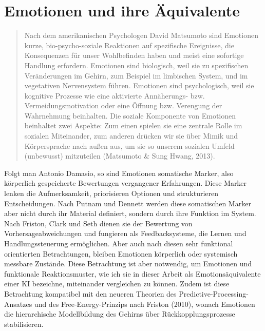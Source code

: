 \section*{Emotionen und ihre Äquivalente}
\begin{quotation}
  Nach dem amerikanischen Psychologen David Matsumoto sind Emotionen kurze, bio-psycho-soziale Reaktionen auf spezifische Ereignisse, die Konsequenzen für unser Wohlbefinden haben und meist eine sofortige Handlung erfordern. Emotionen sind biologisch, weil sie zu spezifischen Veränderungen im Gehirn, zum Beispiel im limbischen System, und im vegetativen Nervensystem führen. Emotionen sind psychologisch, weil sie kognitive Prozesse wie eine aktivierte Annäherungs- bzw. Vermeidungsmotivation oder eine Öffnung bzw. Verengung der Wahrnehmung beinhalten. Die soziale Komponente von Emotionen beinhaltet zwei Aspekte: Zum einen spielen sie eine zentrale Rolle im sozialen Miteinander, zum anderen drücken wir sie über Mimik und Körpersprache nach außen aus, um sie so unserem sozialen Umfeld (unbewusst) mitzuteilen (Matsumoto \& Sung Hwang, 2013).
\end{quotation}

Folgt man Antonio Damasio, so sind Emotionen somatische Marker, also körperlich gespeicherte Bewertungen vergangener Erfahrungen. Diese Marker lenken die Aufmerksamkeit, priorisieren Optionen und strukturieren Entscheidungen. Nach Putnam und Dennett werden diese somatischen Marker aber nicht durch ihr Material definiert, sondern durch ihre Funktion im System. Nach Friston, Clark und Seth dienen sie der Bewertung von Vorhersageabweichungen und fungieren als Feedbacksysteme, die Lernen und Handlungssteuerung ermöglichen. Aber auch nach diesen sehr funktional orientierten Betrachtungen, bleiben Emotionen körperlich oder systemisch messbare Zustände. Diese Betrachtung ist aber notwendig, um Emotionen und funktionale Reaktionsmuster, wie ich sie in dieser Arbeit als Emotionsäquivalente einer KI bezeichne, miteinander vergleichen zu können. Zudem ist diese Betrachtung kompatibel mit den neueren Theorien des Predictive-Processing-Ansatzes und des Free-Energy-Prinzips nach Friston (2010), wonach Emotionen die hierarchische Modellbildung des Gehirns über Rückkopplungsprozesse stabilisieren.

